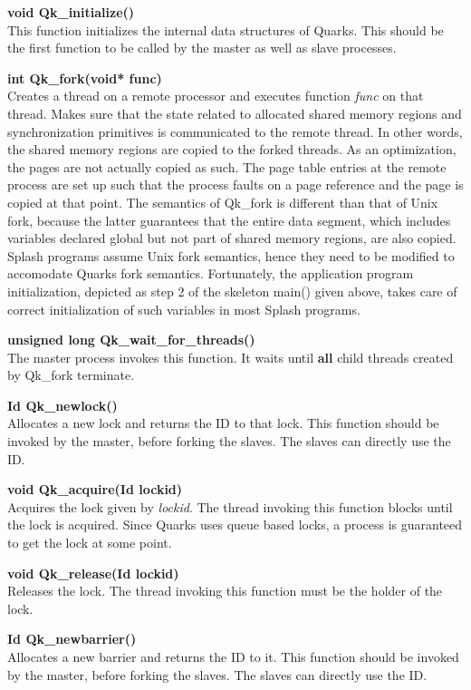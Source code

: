 
\setlength{\parindent}{0 cm}
{\bf void Qk\_initialize() } \\
This function initializes the internal data structures of Quarks. This
should be the first function to be called by the master as well as
slave processes. 

{\bf int       Qk\_fork(void* func)} \\
Creates a thread on a remote processor and executes
function {\em func} on that thread. Makes sure that the
state related to allocated shared memory regions
and synchronization primitives is communicated to the remote 
thread. In other words, the shared memory regions are copied to the
forked threads. As an optimization, the pages are not
actually copied as such. The page table entries at the remote
process are set up such that the process faults on a page reference
and the page is copied at that point. The semantics of Qk\_fork is
different than that of Unix fork, because the latter guarantees that
the entire data segment, which includes variables declared global but
not part of shared memory regions, are also copied. Splash programs
assume Unix fork semantics, hence they need to be modified to
accomodate Quarks fork semantics. Fortunately, the application
program initialization, depicted as step 2 of the skeleton main()
given above, takes care of correct initialization of such variables in
most Splash programs. 

{\bf unsigned long Qk\_wait\_for\_threads() } \\
The master process invokes this function. It waits
until {\bf all} child threads created by Qk\_fork terminate.

{\bf Id    Qk\_newlock()} \\
Allocates a new lock and returns the ID to that lock. This function
should be invoked by the master, before forking the slaves. The slaves
can directly use the ID. 

{\bf void      Qk\_acquire(Id lockid)} \\
 Acquires the lock given by {\em lockid}. The thread 
 invoking this function blocks until the lock is 
 acquired. Since Quarks uses queue based locks, a process is
guaranteed to get the lock at some point. 

{\bf void      Qk\_release(Id lockid)} \\
Releases the lock. The thread invoking this function
must be the holder of the lock.

{\bf Id Qk\_newbarrier()} \\
Allocates a new barrier and returns the ID to it. This function should
be invoked by the master, before forking the slaves. The slaves can
directly use the ID. 

